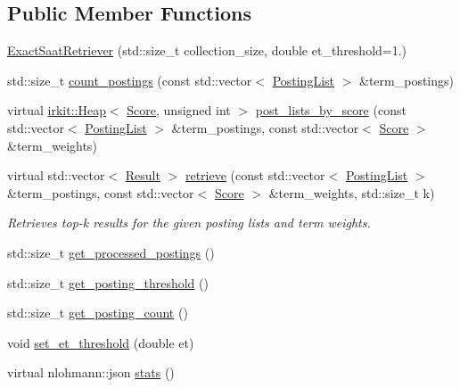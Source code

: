 \subsection*{Public Member Functions}
\begin{DoxyCompactItemize}
\item 
\hyperlink{classbloodhound_1_1query_1_1ExactSaatRetriever_a50c5c53b4b7aff76e4eabf040219be52}{Exact\+Saat\+Retriever} (std\+::size\+\_\+t collection\+\_\+size, double et\+\_\+threshold=1.)
\item 
std\+::size\+\_\+t \hyperlink{classbloodhound_1_1query_1_1ExactSaatRetriever_a21f4192190392fee8d8b12b99c6bbe0e}{count\+\_\+postings} (const std\+::vector$<$ \hyperlink{classbloodhound_1_1PostingList}{Posting\+List} $>$ \&term\+\_\+postings)
\item 
virtual \hyperlink{classirkit_1_1Heap}{irkit\+::\+Heap}$<$ \hyperlink{structbloodhound_1_1Score}{Score}, unsigned int $>$ \hyperlink{classbloodhound_1_1query_1_1ExactSaatRetriever_a180277ad96862e92c102066586edc74f}{post\+\_\+lists\+\_\+by\+\_\+score} (const std\+::vector$<$ \hyperlink{classbloodhound_1_1PostingList}{Posting\+List} $>$ \&term\+\_\+postings, const std\+::vector$<$ \hyperlink{structbloodhound_1_1Score}{Score} $>$ \&term\+\_\+weights)
\item 
virtual std\+::vector$<$ \hyperlink{structbloodhound_1_1query_1_1Result}{Result} $>$ \hyperlink{classbloodhound_1_1query_1_1ExactSaatRetriever_aced2763cc2a4c12838fef4a20759049e}{retrieve} (const std\+::vector$<$ \hyperlink{classbloodhound_1_1PostingList}{Posting\+List} $>$ \&term\+\_\+postings, const std\+::vector$<$ \hyperlink{structbloodhound_1_1Score}{Score} $>$ \&term\+\_\+weights, std\+::size\+\_\+t k)
\begin{DoxyCompactList}\small\item\em Retrieves top-\/k results for the given posting lists and term weights. \end{DoxyCompactList}\item 
std\+::size\+\_\+t \hyperlink{classbloodhound_1_1query_1_1ExactSaatRetriever_a1cf3c5e50a72880e1eb8d995ff22b20a}{get\+\_\+processed\+\_\+postings} ()
\item 
std\+::size\+\_\+t \hyperlink{classbloodhound_1_1query_1_1ExactSaatRetriever_a5d3a882f8f117130a4be46e711397e3c}{get\+\_\+posting\+\_\+threshold} ()
\item 
std\+::size\+\_\+t \hyperlink{classbloodhound_1_1query_1_1ExactSaatRetriever_a43b6bd8cdc3a64c5eabf778230c53419}{get\+\_\+posting\+\_\+count} ()
\item 
void \hyperlink{classbloodhound_1_1query_1_1ExactSaatRetriever_a78016cfffe921ed440dec62c6f82f4cc}{set\+\_\+et\+\_\+threshold} (double et)
\item 
virtual nlohmann\+::json \hyperlink{classbloodhound_1_1query_1_1ExactSaatRetriever_a716838f463f124964e76f48bc37d32cc}{stats} ()
\end{DoxyCompactItemize}
